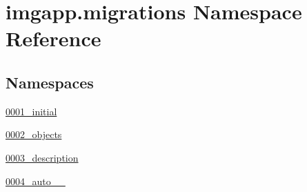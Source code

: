 \hypertarget{namespaceimgapp_1_1migrations}{}\section{imgapp.\+migrations Namespace Reference}
\label{namespaceimgapp_1_1migrations}
\subsection*{Namespaces}
\begin{DoxyCompactItemize}
\item 
 \hyperlink{namespaceimgapp_1_1migrations_1_10001__initial}{0001\+\_\+initial}
\item 
 \hyperlink{namespaceimgapp_1_1migrations_1_10002__objects}{0002\+\_\+objects}
\item 
 \hyperlink{namespaceimgapp_1_1migrations_1_10003__description}{0003\+\_\+description}
\item 
 \hyperlink{namespaceimgapp_1_1migrations_1_10004__auto__20190715__1327}{0004\+\_\+auto\+\_\+\_}
\end{DoxyCompactItemize}
